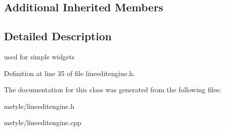 \subsection*{Additional Inherited Members}


\subsection{Detailed Description}
used for simple widgets 

Definition at line 35 of file lineeditengine.\+h.



The documentation for this class was generated from the following files\+:\begin{DoxyCompactItemize}
\item 
mstyle/lineeditengine.\+h\item 
mstyle/lineeditengine.\+cpp\end{DoxyCompactItemize}
